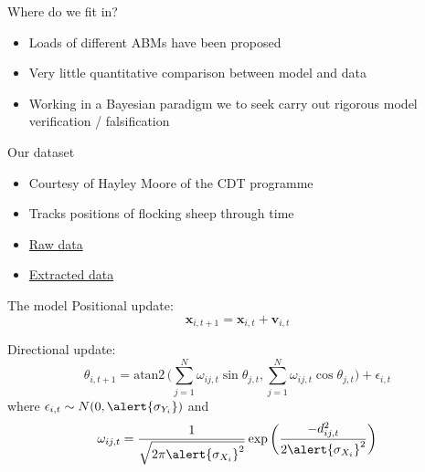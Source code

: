 \documentclass[12pt]{beamer}
\renewcommand{\emph}[1]{{\color{mLightBrown}#1}}
\begin{document}
\begin{frame}{Where do we fit in?}
    \begin{itemize}
        \setlength\itemsep{1em}
        \item Loads of different ABMs have been proposed
        \item Very little \alert{quantitative} comparison between model and data
        \item Working in a \emph{Bayesian} paradigm we to seek carry out rigorous model verification /
            falsification
    \end{itemize}
\end{frame}

\begin{frame}{Our dataset}
    \begin{itemize}
        \setlength\itemsep{1em}
        \item Courtesy of Hayley Moore of the CDT programme
        \item Tracks positions of flocking sheep through time 
        \item \alert{\href{https://jwalton.info/assets/pgr_2019/vid1.mp4}{Raw data}}
        \item \alert{\href{https://jwalton.info/assets/pgr_2019/vid2.mp4}{Extracted data}}
    \end{itemize}
\end{frame}

\begin{frame}{The model}
    Positional update:
    \begin{equation*}
        \bm{x}_{i, t+1} = \bm{x}_{i, t} + \bm{v}_{i, t}
    \end{equation*}

    Directional update:
    \begin{equation*}
        \theta_{i, t+1} = \text{atan2}\,\Bigg({\sum_{j=1}^N \omega_{ij, t} \sin \theta_{j, t},
                                               \sum_{j=1}^N \omega_{ij, t} \cos \theta_{j, t}}\Bigg)
                        + \epsilon_{i, t}
    \end{equation*}
    where $\epsilon_{i, t} \sim N(0, \alert{\sigma_{Y_i}})$ and
    \begin{equation*} 
        \omega_{ij, t} = \frac{1}{\sqrt{2\pi\alert{\sigma_{X_i}}^2}}
                         \exp{\bigg(\frac{-d_{ij, t}^2}{2\alert{\sigma_{X_i}}^2}\bigg)}
    \end{equation*}
\end{frame}
\end{document}

